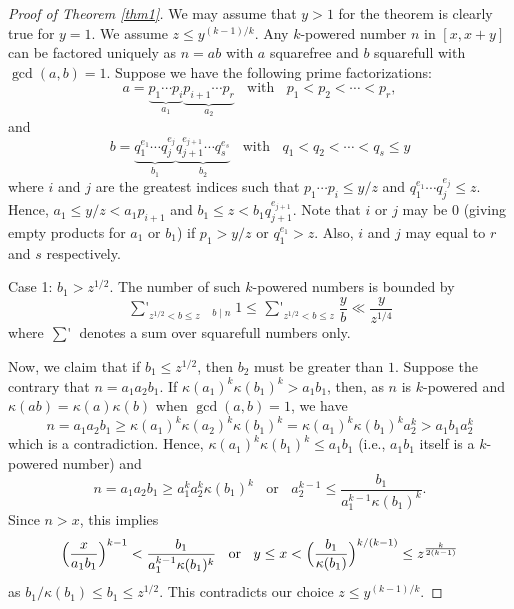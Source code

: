 \documentclass[12pt]{article}
\begin{document}
\begin{proof}[Proof of Theorem \ref{thm1}]
We may assume that $y > 1$ for the theorem is clearly true for $y = 1$. We assume $z \le y^{(k - 1) / k}$. Any $k$-powered number $n$ in $[x, x + y]$ can be factored uniquely as $n = a b$ with $a$ squarefree and $b$ squarefull with $\gcd(a, b) = 1$. Suppose we have the following prime factorizations:
\[
a = \underbrace{p_1 \cdots p_i}_{a_1} \underbrace{p_{i+1} \cdots p_r}_{a_2}\; \; \text{ with } \; \; p_1 < p_2 < \cdots < p_r,
\]
and
\[
b = \underbrace{q_1^{e_1} \cdots q_j^{e_j}}_{b_1} \underbrace{q_{j+1}^{e_{j+1}} \cdots q_s^{e_s}}_{b_2} \; \; \text{ with } \; \; q_1 < q_2 < \cdots < q_s \le y
\]
where $i$ and $j$ are the greatest indices such that $p_1 \cdots p_i \le y / z$ and $q_1^{e_1} \cdots q_j^{e_j} \le z$. Hence, $a_1 \le y / z < a_1 p_{i+1}$ and $b_1 \le z < b_1 q_{j+1}^{e_{j+1}}$. Note that $i$ or $j$ may be $0$ (giving empty products for $a_1$ or $b_1$) if $p_1 > y / z$ or $q_1^{e_1} > z$. Also, $i$ and $j$ may equal to $r$ and $s$ respectively.

\bigskip

Case 1: $b_1 > z^{1/2}$. The number of such $k$-powered numbers is bounded by
\begin{equation} \label{c1}
\mathop{\sum\nolimits'}_{z^{1/2} < b \le z} \; \mathop{\sum_{x < n \le x + y}}_{b \mid n} 1 \le  \mathop{\sum\nolimits'}_{z^{1/2} < b \le z} \frac{y}{b} \ll \frac{y}{ z^{1/4}}
\end{equation}
where $\mathop{\sum\nolimits'}$ denotes a sum over squarefull numbers only.

\bigskip

Now, we claim that if $b_1 \le z^{1/2}$, then $b_2$ must be greater than $1$. Suppose the contrary that $n = a_1 a_2 b_1$. If $\kappa(a_1)^k \kappa(b_1)^k > a_1 b_1$, then, as $n$ is $k$-powered and $\kappa(a b) = \kappa(a) \kappa(b)$ when $\gcd(a, b) = 1$, we have
\[
n = a_1 a_2 b_1 \ge \kappa(a_1)^k \kappa(a_2)^k \kappa(b_1)^k = \kappa(a_1)^k \kappa(b_1)^k a_2^k > a_1 b_1 a_2^k
\]
which is a contradiction. Hence, $\kappa(a_1)^k \kappa(b_1)^k \le a_1 b_1$ (i.e., $a_1 b_1$ itself is a $k$-powered number) and 
\[
n = a_1 a_2 b_1 \ge a_1^k a_2^k \kappa(b_1)^k \; \; \text{ or } \; \; a_2^{k - 1} \le \frac{b_1}{a_1^{k - 1} \kappa(b_1)^k}.
\]
Since $n > x$, this implies
\[
\Bigl( \frac{x}{a_1 b_1} \Bigr)^{k-1} < \frac{b_1}{a_1^{k - 1} \kappa(b_1)^k} \; \; \text{ or } \; \; y \le x < \Bigl( \frac{b_1}{\kappa(b_1)} \Bigr)^{k / (k-1)} \le z^{\frac{k}{2(k-1)}}
\]
as $b_1 / \kappa(b_1) \le b_1 \le z^{1/2}$. This contradicts our choice $z \le y^{(k-1) / k}$.


\end{proof}
\end{document}
